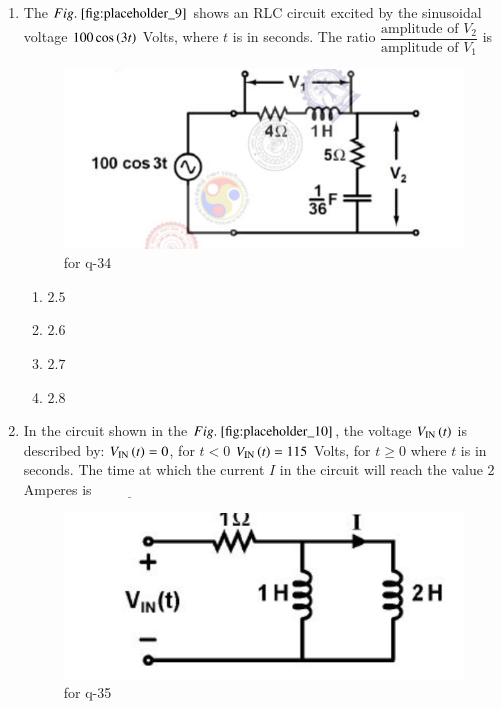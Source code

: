 \documentclass[journal,12pt,onecolumn]{IEEEtran}
\theoremstyle{remark}
\begin{document}
\begin{enumerate}
\item The $\figref{fig:placeholder_9}$ shows an RLC circuit excited by the sinusoidal voltage $100 \cos\left(3t\right)$ Volts, where $t$ is in seconds. The ratio $\dfrac{\text{amplitude of } V_2}{\text{amplitude of } V_1}$ is
\begin{figure}[H]
    \centering
    \includegraphics[width=0.5\columnwidth]{figs/9.png}
    \caption{\centering for q-34}
    \label{fig:placeholder_9}
\end{figure}
\begin{multicols}{4}
\begin{enumerate}
\item $2.5$
\item $2.6$
\item $2.7$
\item $2.8$
\end{enumerate}
\end{multicols}
\hfill {}

\item In the circuit shown in the $\figref{fig:placeholder_10}$, the voltage $V_{\text{IN}}\left(t\right)$ is described by:  
$V_{\text{IN}}\left(t\right) = 0$, for $t < 0$  
$V_{\text{IN}}\left(t\right) = 115$ Volts, for $t \geq 0$  
where $t$ is in seconds. The time  at which the current $I$ in the circuit will reach the value $2$ Amperes is $\underline{\hspace{2cm}}$
\begin{figure}[H]
    \centering
    \includegraphics[width=0.5\columnwidth]{figs/10.png}
    \caption{\centering for q-35}
    \label{fig:placeholder_10}
\end{figure}

\hfill {}


\end{enumerate}
\end{document}
